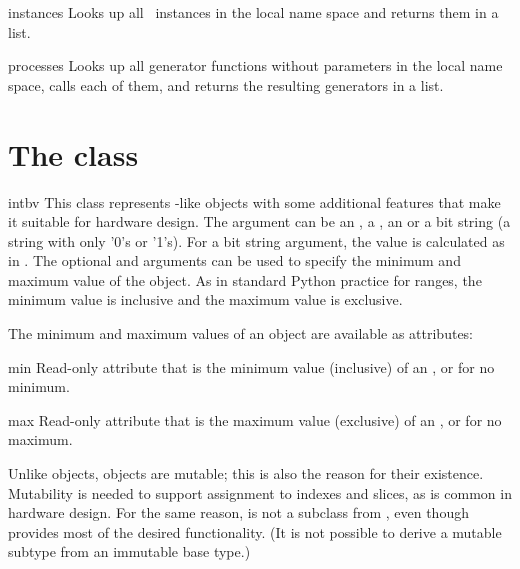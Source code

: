 \begin{funcdesc}{instances}{}
Looks up all \myhdl\ instances in the local name space and returns them
in a list.

\end{funcdesc}
\begin{funcdesc}{processes}{}
Looks up all generator functions without parameters in the local name
space, calls each of them, and returns the resulting generators in a list.
\end{funcdesc}

\section{The  class \label{ref-intbv}}

\begin{classdesc}{intbv}{  
}
This class represents -like objects with some additional
features that make it suitable for hardware design. The 
argument can be an , a , an  or a
bit string (a string with only '0's or '1's). For a bit string
argument, the value is calculated as in .  The optional  and  arguments can be used to
specify the minimum and maximum value of the  object. As
in standard Python practice for ranges, the minimum value is inclusive
and the maximum value is exclusive.
\end{classdesc}

The minimum and maximum values of an  object
are available as attributes:

\begin{memberdesc}[intbv]{min}
Read-only attribute that is the minimum value (inclusive) of an
, or  for no minimum.
\end{memberdesc}
\begin{memberdesc}[intbv]{max}
Read-only attribute that is the maximum value
(exclusive) of an , or  for no 
maximum.
\end{memberdesc}

Unlike  objects,  objects are mutable; this is
also the reason for their existence. Mutability is needed to support
assignment to indexes and slices, as is common in hardware design. For
the same reason,  is not a subclass from ,
even though  provides most of the desired
functionality. (It is not possible to derive a mutable subtype from
an immutable base type.)

